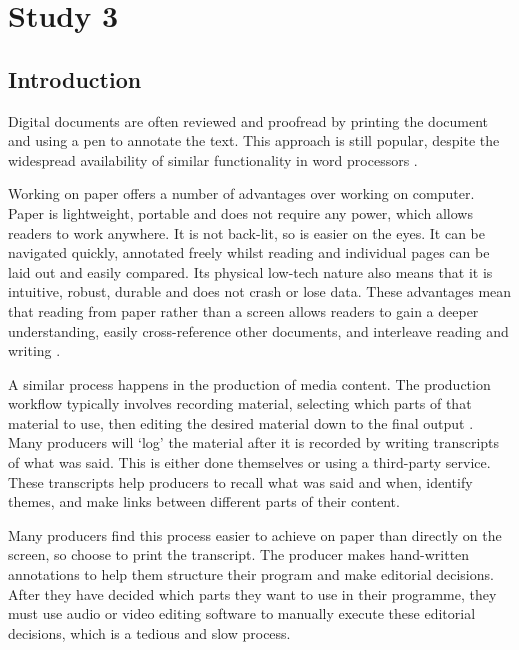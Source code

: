 \chapter{Study 3}

\section{Introduction}

Digital documents are often reviewed and proofread by printing the document and
using a pen to annotate the text. This approach is still popular, despite the
widespread availability of similar functionality in word processors
\cite{Harper2001}.

Working on paper offers a number of advantages over working on computer.
Paper is lightweight, portable and does not require any power, which allows readers to work anywhere.
It is not back-lit, so is easier on the eyes.
It can be navigated quickly, annotated freely whilst reading and individual pages can be laid out and easily compared.
Its physical low-tech nature also means that it is intuitive, robust, durable and does not crash or lose data.
These advantages mean that reading
from paper rather than a screen allows readers to gain a deeper understanding,
easily cross-reference other documents, and interleave reading and writing
\cite{OHara1997}.


A similar process happens in the production of media content. The production
workflow typically involves recording material, selecting which parts of that
material to use, then editing the desired material down to the final output
\cite{Baume2015}.  Many producers will `log' the material after it is recorded
by writing transcripts of what was said.  This is either done themselves or
using a third-party service. These transcripts help producers to recall what
was said and when, identify themes, and make links between different parts of
their content.

Many producers find this process easier to achieve on paper than directly on
the screen, so choose to print the transcript. The producer makes hand-written
annotations to help them structure their program and make editorial decisions.
After they have decided which parts they want to use in their programme,
they must use audio or video editing software to manually execute these
editorial decisions, which is a tedious and slow process.

